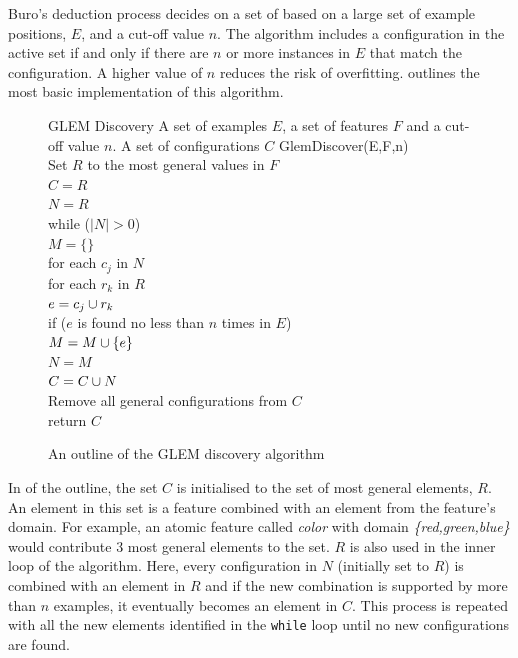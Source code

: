 Buro's deduction process \cite{buro:feature} decides on a set of  based on a large set of example positions, $E$, and a cut-off value $n$. The algorithm includes a configuration in the active set if and only if there are $n$ or more instances in $E$ that match the configuration. A higher value of $n$ reduces the risk of overfitting.   outlines the most basic implementation of this algorithm.
\begin{figure}[h!]
\begin{algorithm}
{GLEM Discovery}
{A set of examples $E$, a set of features $F$ and a cut-off value $n$.}
{A set of configurations $C$} 
GlemDiscover(E,F,n) \+\\
	Set $R$ to the most general values in $F$ \label{line:glem_general} \\
	$C = R$ \\
	$N = R$ \\
	while ($|N| > 0$) \+\\
		$M = \{\}$ \\
		for each $c_j$ in $N$ \+\\
			for each $r_k$ in $R$ \+ \\
				$e = c_j \cup r_k$ \\
				if ($e$ is found no less than $n$ times in $E$) \+\\ 
					$M = M \cup \{e\}$ \-\-\-\\
		$N = M$ \\
		$C = C \cup N$ \-\\			
	Remove all general configurations from $C$	\label{line:glem_specific} \\
	return $C$ 
\end{algorithm}
\caption{An outline of the GLEM discovery algorithm}
\label{alg:glem_discovery}	
\end{figure}

In  of the outline, the set $C$ is initialised to the set of most general elements, $R$. An element in this set is a feature combined with an element from the feature's domain.  For example, an atomic feature called {\it color} with domain {\it \{red,green,blue\}} would contribute 3 most general elements to the set.  $R$ is also used in the inner loop of the algorithm.  Here, every configuration in $N$ (initially set to $R$) is combined with an element in $R$ and if the new combination is supported by more than $n$ examples, it eventually becomes an element in $C$.  This process is repeated with all the new elements identified in the {\tt while} loop until no new configurations are found.  

